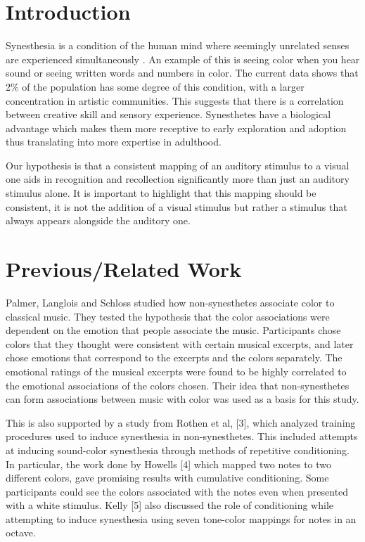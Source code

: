 \documentclass{sigchi}
\begin{document}
\section{Introduction}

Synesthesia is a condition of the human mind where seemingly unrelated senses are experienced simultaneously \cite{Ramachandran}. An example of this is seeing color when you hear sound or seeing written words and numbers in color. The current data shows that 2\% of the population has some degree of this condition, with a larger concentration in artistic communities. This suggests that there is a correlation between creative skill and sensory experience. Synesthetes have a biological advantage which makes them more receptive to early exploration and adoption thus translating into more expertise in adulthood.

Our hypothesis is that a consistent mapping of an auditory stimulus to a visual one aids in recognition and recollection significantly more than just an auditory stimulus alone. It is important to highlight that this mapping should be consistent, it is not the addition of a visual stimulus but rather a stimulus that always appears alongside the auditory one.

\section{Previous/Related Work}

Palmer, Langlois and Schloss \cite{Langlois} studied how non-synesthetes associate color to classical music. They tested the hypothesis that the color associations were dependent on the emotion that people associate the music. Participants chose colors that they thought were consistent with certain musical excerpts, and later chose emotions that correspond to the excerpts and the colors separately. The emotional ratings of the musical excerpts were found to be highly correlated to the emotional associations of the colors chosen. Their idea that non-synesthetes can form associations between music with color was used as a basis for this study.

This is also supported by a study from Rothen et al, [3], which analyzed training procedures used to induce synesthesia in non-synesthetes. This included attempts at inducing sound-color synesthesia through methods of repetitive conditioning. In particular, the work done by Howells [4] which mapped two notes to two different colors, gave promising results with cumulative conditioning. Some participants could see the colors associated with the notes even when presented with a white stimulus. Kelly [5] also discussed the role of conditioning while attempting to induce synesthesia using seven tone-color mappings for notes in an octave. 
\end{document}
